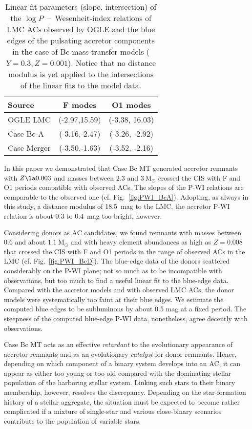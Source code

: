 \documentclass[a4paper,fleqn,usenatbib]{mnras}
\newcommand{\msol}{~\mathrm{M}_\odot}
\begin{document}
\begin{table}
	\centering
	\caption{Linear fit parameters (slope, intersection) of the 
	         $\log P$~--~Wesenheit-index relations of LMC ACs 
	         observed by OGLE and the blue edges of
			 the pulsating accretor components in the case of
			 Bc mass-transfer models ($Y=0.3, Z=0.001$).
			 Notice that no distance modulus is yet applied
			 to the intersections of the linear fits to the model data. 
			 }
	\label{tab:PWI-Fits}
	\begin{tabular}{lcc} %
		\hline
		Source      & F modes 			& O1 modes         \\
		\hline
		OGLE LMC    & (-2.97,15.59) 	& (-3.38, 16.03)   \\
		Case Bc-A   & (-3.16,-2.47) 	& (-3.26, -2.92)   \\
		Case Merger & (-3.50,-1.63)     & (-3.52, -2.16)   \\
		\hline
	\end{tabular}
\end{table}



In this paper we demonstrated that Case Bc MT generated accretor remnants 
with $Z\la 0.003$ and masses between $2.3$ and $3 \msol$ crossed the CIS with 
F and O1 periods compatible with observed ACs. The slopes of the P-WI relations 
are comparable to the observed one (cf. Fig.~\ref{fig:PWI_BcA}). 
Adopting, as always in this study, a distance modulus of 
18.5~mag to the LMC, the accretor P-WI relation is about $0.3$ to $0.4$~mag too bright, however. 

Considering donors as AC candidates, we found remnants with masses between $0.6$ and about
$1.1 \msol$ and with heavy element abundances as high as $Z=0.008$ that crossed the CIS with
F and O1 periods in the range of observed ACs in the LMC (cf. Fig.~\ref{fig:PWI_BcD}). 
The blue-edge data of the donors scattered considerably on the P-WI plane; not so much as to
be incompatible with observations, but too much to find a useful linear fit to the 
blue-edge data. Compared with the accretor models and with observed LMC ACs, the donor models 
were systematically too faint at their blue edges. We estimate the computed blue edges to be
subluminous by about 0.5 mag at a fixed period. The steepness of the computed blue-edge
P-WI data, nonetheless, agree decently with observations.    

Case Bc MT acts as an 
effective \emph{retardant} to the evolutionary appearance of 
accretor remnants and as an evolutionary \emph{catalyst} for donor remnants.
Hence, depending on which component of a binary system develops into an AC,
it can appear as either too young or too old compared with the dominating stellar
population of the harboring stellar system. 
Linking such stars to their binary membership, however, resolves the discrepancy.
Depending on the star-formation history of a stellar aggregate, the situation must be expected
to become rather complicated if a mixture of single-star and various close-binary scenarios 
contribute to the population of variable stars. 
\end{document}
